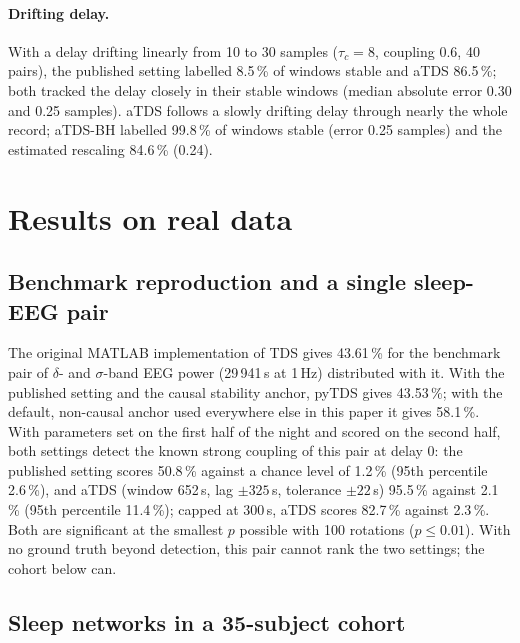 \documentclass[11pt,a4paper]{article}
\begin{document}
\paragraph{Drifting delay.} With a delay drifting linearly from 10 to 30 samples ($\tau_c = 8$, coupling 0.6, 40 pairs), the published setting labelled 8.5\,\% of windows stable and aTDS 86.5\,\%; both tracked the delay closely in their stable windows (median absolute error 0.30 and 0.25 samples). aTDS follows a slowly drifting delay through nearly the whole record; aTDS-BH labelled 99.8\,\% of windows stable (error 0.25 samples) and the estimated rescaling 84.6\,\% (0.24).

\section{Results on real data}
\label{sec:realdata}
\subsection{Benchmark reproduction and a single sleep-EEG pair}
\label{sec:res-benchmark}
The original MATLAB implementation of TDS gives 43.61\,\% for the benchmark pair of $\delta$- and $\sigma$-band EEG power (29\,941\,s at 1\,Hz) distributed with it. With the published setting and the causal stability anchor, pyTDS gives 43.53\,\%; with the default, non-causal anchor used everywhere else in this paper it gives 58.1\,\%. With parameters set on the first half of the night and scored on the second half, both settings detect the known strong coupling of this pair at delay 0: the published setting scores 50.8\,\% against a chance level of 1.2\,\% (95th percentile 2.6\,\%), and aTDS (window 652\,s, lag $\pm325$\,s, tolerance $\pm22$\,s) 95.5\,\% against 2.1\,\% (95th percentile 11.4\,\%); capped at 300\,s, aTDS scores 82.7\,\% against 2.3\,\%. Both are significant at the smallest $p$ possible with 100 rotations ($p \le 0.01$). With no ground truth beyond detection, this pair cannot rank the two settings; the cohort below can.

\subsection{Sleep networks in a 35-subject cohort}
\label{sec:res-cohort}
\end{document}
